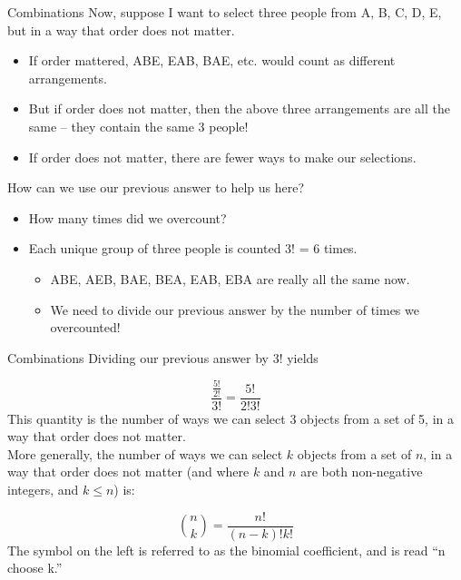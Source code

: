 \documentclass[aspectratio=169]{../latex_main/tntbeamer}  %
\begin{document}
		\begin{frame}{Combinations}
	    Now, suppose I want to select three people from {A, B, C, D, E}, but in a way that order does not matter.

        \begin{itemize}
            \item If order mattered, ABE, EAB, BAE, etc. would count as different arrangements.
            \item But if order does not matter, then the above three arrangements are all the same – they contain the same 3 people!
            \item If order does not matter, there are fewer ways to make our selections. 
        \end{itemize}
        How can we use our previous answer to help us here?
        \begin{itemize}
            \item How many times did we overcount?
            \item Each unique group of three people is counted 3! = 6 times.
            \begin{itemize}
                \item ABE, AEB, BAE, BEA, EAB, EBA are really all the same now.
                \item We need to divide our previous answer by the number of times we overcounted!
            \end{itemize}
        \end{itemize}

	\end{frame}
	
	
	\begin{frame}{Combinations}
	    Dividing our previous answer by 3! yields


        \begin{equation*}
            \frac{\frac{5!}{2!}}{3!} = \frac{5!}{2!3!}
        \end{equation*}
        This quantity is the number of ways we can select 3 objects from a set of 5, in a way that order does not matter.\\
        
        More generally, the number of ways we can select $k$ objects from a set of $n$, in a way that order does not matter (and where $k$ and $n$ are both non-negative integers, and $k \leq n$) is:

        \begin{equation*}
            \binom{n}{k}= \frac{n!}{(n-k)!k!}
        \end{equation*}
        The symbol on the left is referred to as the binomial coefficient, and is read “n choose k.”

	\end{frame}
	
\end{document}
